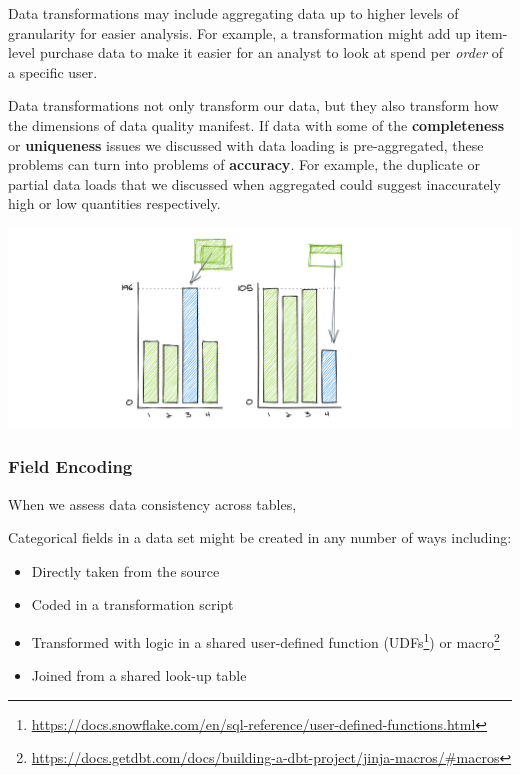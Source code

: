 \documentclass[
]{krantz}
\providecommand{\tightlist}{%
  \setlength{\itemsep}{0pt}\setlength{\parskip}{0pt}}
\renewcommand{\href}[2]{#2\footnote{\url{#1}}}
\begin{document}
Data transformations may include aggregating data up to higher levels of granularity for easier analysis. For example, a transformation might add up item-level purchase data to make it easier for an analyst to look at spend per \emph{order} of a specific user.

Data transformations not only transform our data, but they also transform how the dimensions of data quality manifest. If data with some of the \textbf{completeness} or \textbf{uniqueness} issues we discussed with data loading is pre-aggregated, these problems can turn into problems of \textbf{accuracy}. For example, the duplicate or partial data loads that we discussed when aggregated could suggest inaccurately high or low quantities respectively.

\begin{center}\includegraphics[width=0.9\linewidth]{figures/data-dall/completeness-accuracy} \end{center}

\hypertarget{field-encoding-1}{%
\subsubsection{Field Encoding}\label{field-encoding-1}}

When we assess data consistency across tables,

Categorical fields in a data set might be created in any number of ways including:

\begin{itemize}
\tightlist
\item
  Directly taken from the source
\item
  Coded in a transformation script
\item
  Transformed with logic in a shared user-defined function (\href{https://docs.snowflake.com/en/sql-reference/user-defined-functions.html}{UDFs}) or \href{https://docs.getdbt.com/docs/building-a-dbt-project/jinja-macros/\#macros}{macro}
\item
  Joined from a shared look-up table
\end{itemize}
\end{document}
